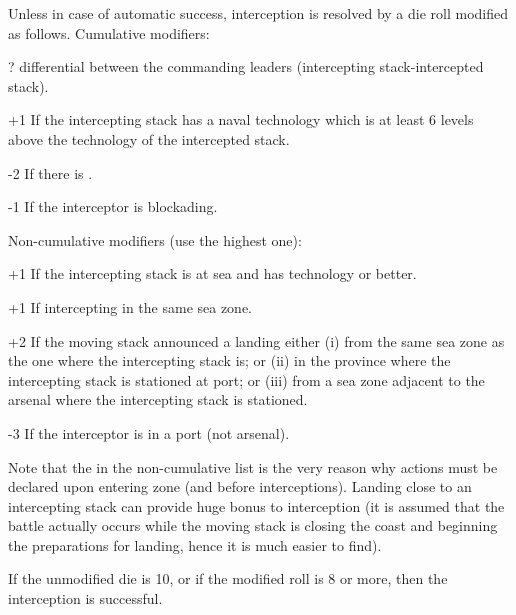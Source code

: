Unless in case of automatic success, interception is resolved by a die roll
modified as follows. Cumulative modifiers:
\begin{modlist}
\item[\textplusminus?] \Man differential between the commanding leaders
  (intercepting stack-intercepted stack).
\item[+1] If the intercepting stack has a naval technology which is at least 6
  levels above the technology of the intercepted stack.
\item[-2] If there is .
\item[-1] If the interceptor is blockading.
\end{modlist}
Non-cumulative modifiers (use the highest one):
\begin{modlist}
\item[+1] If the intercepting stack is at sea and has technology \TTD or
  better.
\item[+1] If intercepting in the same sea zone.
\item[+2] If the moving stack announced a landing either (i) from the same sea
  zone as the one where the intercepting stack is; or (ii) in the province
  where the intercepting stack is stationed at port; or (iii) from a sea zone
  adjacent to the arsenal where the intercepting stack is stationed.
\item[-3] If the interceptor is in a port (not arsenal).
\end{modlist}

Note that the  in the non-cumulative list is the very reason why
actions must be declared upon entering zone (and before
interceptions). Landing close to an intercepting stack can provide huge bonus
to interception (it is assumed that the battle actually occurs while the
moving stack is closing the coast and beginning the preparations for landing,
hence it is much easier to find).

If the unmodified die is 10, or if the modified roll is 8 or more, then the
interception is successful.

